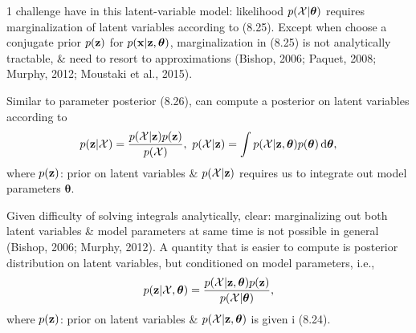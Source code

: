 \documentclass{article}
\begin{document}
\begin{itemize}
\begin{itemize}
\begin{itemize}
			1 challenge have in this latent-variable model: likelihood $p({\cal X}|\boldsymbol{\theta})$ requires marginalization of latent variables according to (8.25). Except when choose a conjugate prior $p({\bf z})$ for $p({\bf x}|{\bf z},\boldsymbol{\theta})$, marginalization in (8.25) is not analytically tractable, \& need to resort to approximations (Bishop, 2006; Paquet, 2008; Murphy, 2012; Moustaki et al., 2015).
			
			Similar to parameter posterior (8.26), can compute a posterior on latent variables according to
			\begin{equation}
				p({\bf z}|{\cal X}) = \frac{p({\cal X}|{\bf z})p({\bf z})}{p({\cal X})},\ p({\cal X}|{\bf z}) = \int p({\cal X}|{\bf z},\boldsymbol{\theta})p(\boldsymbol{\theta})\,{\rm d}\boldsymbol{\theta},
			\end{equation}
			where $p({\bf z})$: prior on latent variables \& $p({\cal X}|{\bf z})$ requires us to integrate out model parameters $\boldsymbol{\theta}$.
			
			Given difficulty of solving integrals analytically, clear: marginalizing out both latent variables \& model parameters at same time is not possible in general (Bishop, 2006; Murphy, 2012). A quantity that is easier to compute is posterior distribution on latent variables, but conditioned on model parameters, i.e.,
			\begin{equation}
				p({\bf z}|{\cal X},\boldsymbol{\theta}) = \frac{p({\cal X}|{\bf z},\boldsymbol{\theta})p({\bf z})}{p({\cal X}|\boldsymbol{\theta})},
			\end{equation}
			where $p({\bf z})$: prior on latent variables \& $p({\cal X}|{\bf z},\boldsymbol{\theta})$ is given i (8.24).
			

\end{itemize}
\end{itemize}
\end{itemize}
\end{document}
